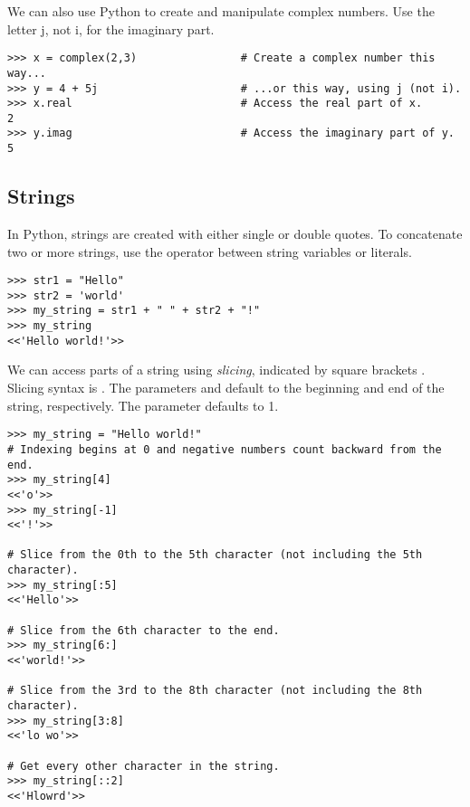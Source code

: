 We can also use Python to create and manipulate complex numbers.
Use the letter j, not i, for the imaginary part.
\begin{lstlisting}
>>> x = complex(2,3)                # Create a complex number this way...
>>> y = 4 + 5j	                    # ...or this way, using j (not i).
>>> x.real                          # Access the real part of x.
2
>>> y.imag                          # Access the imaginary part of y.
5
\end{lstlisting}


\subsection*{Strings}
In Python, strings are created with either single or double quotes.
To concatenate two or more strings, use the \li{+} operator between string variables or literals.
\begin{lstlisting}
>>> str1 = "Hello"
>>> str2 = 'world'
>>> my_string = str1 + " " + str2 + "!"
>>> my_string
<<'Hello world!'>>
\end{lstlisting}

We can access parts of a string using \emph{slicing}, indicated by square brackets \li{[ ]}.
Slicing syntax is .
The parameters  and  default to the beginning and end of the string, respectively.
The parameter  defaults to 1.

\begin{lstlisting}
>>> my_string = "Hello world!"
# Indexing begins at 0 and negative numbers count backward from the end.
>>> my_string[4]
<<'o'>>
>>> my_string[-1]
<<'!'>>

# Slice from the 0th to the 5th character (not including the 5th character).
>>> my_string[:5]
<<'Hello'>>

# Slice from the 6th character to the end.
>>> my_string[6:]
<<'world!'>>

# Slice from the 3rd to the 8th character (not including the 8th character).
>>> my_string[3:8]
<<'lo wo'>>

# Get every other character in the string.
>>> my_string[::2]
<<'Hlowrd'>>
\end{lstlisting}

